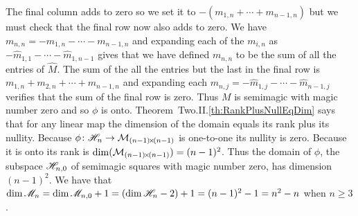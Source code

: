 \begin{exercises}
\begin{answer}
\begin{exparts}
          The final column adds to zero so we set it to 
          $-(m_{1,n}+\cdots+m_{n-1,n})$ but we must check
          that the final row now also adds to zero.
          We have $m_{n,n}=-m_{1,n}-\cdots-m_{n-1,n}$ and expanding each of the
          $m_{i,n}$ as $-\hat{m}_{1,1}-\cdots-\hat{m}_{1,n-1}$
          gives that we have defined $m_{n,n}$ to be the sum of all the entries
          of $\hat{M}$.
          The sum of the all the entries but the last in the final row is
          $m_{1,n}+m_{2,n}+\cdots+m_{n-1,n}$ and expanding each 
          $m_{n,j}=-\hat{m}_{1,j}-\cdots-\hat{m}_{n-1,j}$ 
          verifies that the sum of the final row is zero.
          Thus $M$ is semimagic with magic number zero and so $\phi$ is onto.
        \partsitem
           Theorem~Two.II.\ref{th:RankPlusNullEqDim} says that for any linear 
           map the
           dimension of the domain equals its rank plus its nullity.
           Because $\mbox{$\phi\colon \mathscr{H}_n\to \mathcal{M}_{(n-1) \! \times \! (n-1)}$}$ 
           is one-to-one its nullity is zero.
           Because it is onto its rank is $\dim(\mathcal{M}_{(n-1) \! \times \! (n-1)})=(n-1)^2$.
           Thus the domain of $\phi$, the subspace  
           $\mathscr{H}_{n,0}$ of semimagic squares with magic number zero,
           has dimension~$(n-1)^2$.
         \partsitem   
           We have that $\dim\mathscr{M}_n=\dim\mathscr{M}_{n,0}+1
           =(\dim\mathscr{H}_n-2)+1=(n-1)^2-1=n^2-n$ 
           when $n\geq 3$.
      \end{exparts}
    \end{answer}
\end{exercises}
\endinput


